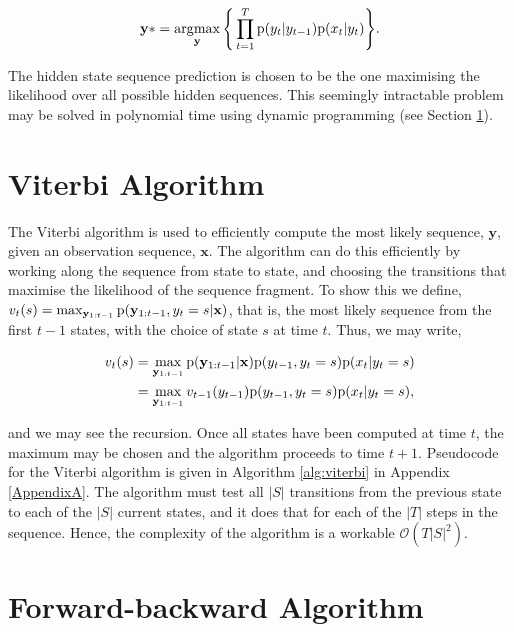 \begin{equation}
\textbf{y}* = \operatorname*{\arg\!\max}_{\textbf{y}}\Bigg\{\prod_{t=1}^T \text{p}(y_t | y_{t-1})\text{p}(x_t | y_t)\Bigg\}.
\label{eq:argmax}
\end{equation}

The hidden state sequence prediction is chosen to be the one maximising the likelihood over all possible hidden sequences. This seemingly intractable problem may be solved in polynomial time using dynamic programming (see Section \ref{sec:viterbi}).

\section{Viterbi Algorithm}
\label{sec:viterbi}

The Viterbi algorithm is used to efficiently compute the most likely sequence, $\textbf{y}$, given an observation sequence, $\textbf{x}$. The algorithm can do this efficiently by working along the sequence from state to state, and choosing the transitions that maximise the likelihood of the sequence fragment. To show this we define, $v_t(s) = \max_{\mathbf{y}_{1:t-1}} \text{p}(\mathbf{y}_{1:t-1}, y_t = s | \mathbf{x})$, that is, the most likely sequence from the first $t-1$ states, with the choice of state $s$ at time $t$. Thus, we may write,

\begin{equation}
\begin{aligned}
v_t(s) &= \max_{\mathbf{y}_{1:t-1}} \text{p}(\mathbf{y}_{1:t-1} | \mathbf{x}) \text{p}(y_{t-1}, y_t = s) \text{p}(x_t | y_t = s) \\
&= \max_{\mathbf{y}_{1:t-1}} v_{t-1}(y_{t-1}) \text{p}(y_{t-1}, y_t = s) \text{p}(x_t | y_t = s), 
\end{aligned}
\label{eq:viterbi}
\end{equation}

and we may see the recursion. Once all states have been computed at time $t$, the maximum may be chosen and the algorithm proceeds to time $t+1$. Pseudocode for the Viterbi algorithm is given in Algorithm \ref{alg:viterbi} in Appendix \ref{AppendixA}. The algorithm must test all $|S|$ transitions from the previous state to each of the $|S|$ current states, and it does that for each of the $|T|$ steps in the sequence. Hence, the complexity of the algorithm is a workable $\mathcal{O}(T|S|^2)$.

\section{Forward-backward Algorithm}
\label{sec:fb}


